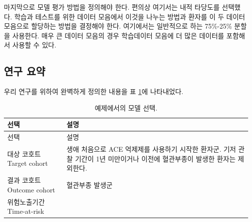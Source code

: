 \documentclass[10.5pt]{book}
\theoremstyle{definition}
\theoremstyle{definition}
\theoremstyle{definition}
\theoremstyle{remark}
\begin{document}
마지막으로 모델 평가 방법을 정의해야 한다. 편의상 여기서는 내적 타당도를
선택했다. 학습과 테스트를 위한 데이터 모음에서 이것을 나누는 방법과
환자를 이 두 데이터 모음으로 할당하는 방법을 결정해야 한다. 여기에서는
일반적으로 하는 75\%-25\% 분할을 사용한다. 매우 큰 데이터 모음의 경우
학습데이터 모음에 더 많은 데이터를 포함해서 사용할 수 있다.

\subsection{연구 요약}\label{--1}

우리 연구를 위하여 완벽하게 정의한 내용을 표 \ref{tab:plpSummary}에
나타내었다.

\begin{longtable}[]{@{}ll@{}}
\caption{\label{tab:plpSummary} 예제에서의 모델 선택.}\tabularnewline
\toprule
\begin{minipage}[b]{0.23\columnwidth}\raggedright\strut
선택\strut
\end{minipage} & \begin{minipage}[b]{0.71\columnwidth}\raggedright\strut
설명\strut
\end{minipage}\tabularnewline
\midrule
\endfirsthead
\toprule
\begin{minipage}[b]{0.23\columnwidth}\raggedright\strut
선택\strut
\end{minipage} & \begin{minipage}[b]{0.71\columnwidth}\raggedright\strut
설명\strut
\end{minipage}\tabularnewline
\midrule
\endhead
\begin{minipage}[t]{0.23\columnwidth}\raggedright\strut
대상 코호트 Target cohort\strut
\end{minipage} & \begin{minipage}[t]{0.71\columnwidth}\raggedright\strut
생애 처음으로 ACE 억제제를 사용하기 시작한 환자군. 기저 관찰 기간이 1년
미만이거나 이전에 혈관부종이 발생한 환자는 제외한다.\strut
\end{minipage}\tabularnewline
\begin{minipage}[t]{0.23\columnwidth}\raggedright\strut
결과 코호트 Outcome cohort\strut
\end{minipage} & \begin{minipage}[t]{0.71\columnwidth}\raggedright\strut
혈관부종 발생군\strut
\end{minipage}\tabularnewline
\begin{minipage}[t]{0.23\columnwidth}\raggedright\strut
위험노출기간 Time-at-risk\strut

\end{minipage}
\end{longtable}
\end{document}
